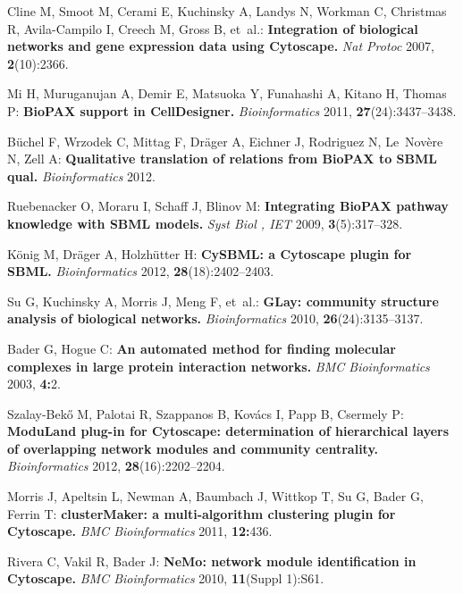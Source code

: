 \documentclass[11pt]{bmc_article_s50}
\begin{document}
\begin{thebibliography}{10}
Cline M, Smoot M, Cerami E, Kuchinsky A, Landys N, Workman C, Christmas R,
  Avila-Campilo I, Creech M, Gross B, et~al.: \textbf{Integration of biological
  networks and gene expression data using Cytoscape.} \emph{Nat Protoc}
  2007, \textbf{2}(10):2366.

Mi H, Muruganujan A, Demir E, Matsuoka Y, Funahashi A, Kitano H, Thomas P:
  \textbf{BioPAX support in CellDesigner.} \emph{Bioinformatics} 2011,
  \textbf{27}(24):3437--3438.

B{\"u}chel F, Wrzodek C, Mittag F, Dr{\"a}ger A, Eichner J, Rodriguez N,
  Le~Nov{\`e}re N, Zell A: \textbf{Qualitative translation of relations from
  BioPAX to SBML qual.} \emph{Bioinformatics} 2012.

Ruebenacker O, Moraru I, Schaff J, Blinov M: \textbf{Integrating BioPAX pathway
  knowledge with SBML models.} \emph{Syst Biol , IET} 2009,
  \textbf{3}(5):317--328.

K{\"o}nig M, Dr{\"a}ger A, Holzh{\"u}tter H: \textbf{CySBML: a Cytoscape plugin
  for SBML.} \emph{Bioinformatics} 2012, \textbf{28}(18):2402--2403.

Su G, Kuchinsky A, Morris J, Meng F, et~al.: \textbf{GLay: community structure
  analysis of biological networks.} \emph{Bioinformatics} 2010,
  \textbf{26}(24):3135--3137.

Bader G, Hogue C: \textbf{An automated method for finding molecular complexes
  in large protein interaction networks.} \emph{BMC Bioinformatics} 2003,
  \textbf{4:}2.

Szalay-Bek{\H{o}} M, Palotai R, Szappanos B, Kov{\'a}cs I, Papp B, Csermely P:
  \textbf{ModuLand plug-in for Cytoscape: determination of hierarchical layers
  of overlapping network modules and community centrality.}
  \emph{Bioinformatics} 2012, \textbf{28}(16):2202--2204.

Morris J, Apeltsin L, Newman A, Baumbach J, Wittkop T, Su G, Bader G, Ferrin T:
  \textbf{clusterMaker: a multi-algorithm clustering plugin for Cytoscape.}
  \emph{BMC Bioinformatics} 2011, \textbf{12:}436.

Rivera C, Vakil R, Bader J: \textbf{NeMo: network module identification in
  Cytoscape.} \emph{BMC Bioinformatics} 2010, \textbf{11}(Suppl 1):S61.


\end{thebibliography}
\end{document}
